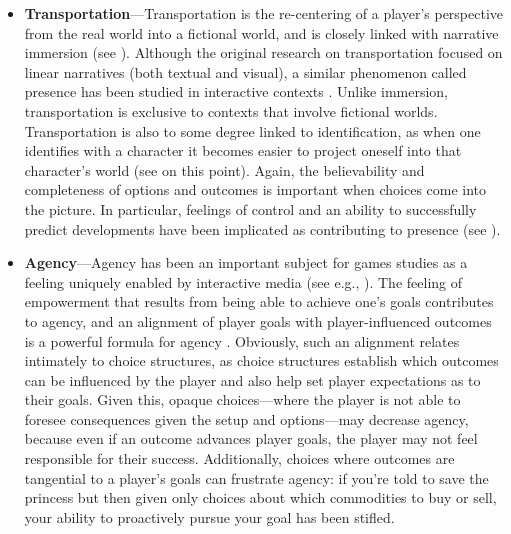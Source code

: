 \begin{itemize}
\item \textbf{Transportation}---Transportation is the re-centering of a player's perspective from the real world into a fictional world, and is closely linked with narrative immersion (see \citep{Green2000,Green2004}).
%
Although the original research on transportation focused on linear narratives (both textual and visual), a similar phenomenon called presence has been studied in interactive contexts \citep{Witmer1998}.
%
Unlike immersion, transportation is exclusive to contexts that involve fictional worlds.
%
Transportation is also to some degree linked to identification, as when one identifies with a character it becomes easier to project oneself into that character's world (see \citep{Busselle2009} on this point).
%
Again, the believability and completeness of options and outcomes is important when choices come into the picture.
%
In particular, feelings of control and an ability to successfully predict developments have been implicated as contributing to presence (see \citep{Witmer1998}).

\item \textbf{Agency}---Agency has been an important subject for games studies as a feeling uniquely enabled by interactive media (see e.g., \citep{Murray1997,Mateas2001,WardripFruin2009,Mason2013}).
%
The feeling of empowerment that results from being able to achieve one's goals contributes to agency, and an alignment of player goals with player-influenced outcomes is a powerful formula for agency \citep{Mateas2001}.
%
Obviously, such an alignment relates intimately to choice structures, as choice structures establish which outcomes can be influenced by the player and also help set player expectations as to their goals.
%
Given this, opaque choices---where the player is not able to foresee consequences given the setup and options---may decrease agency, because even if an outcome advances player goals, the player may not feel responsible for their success.
%
Additionally, choices where outcomes are tangential to a player's goals can frustrate agency: if you're told to save the princess but then given only choices about which commodities to buy or sell, your ability to proactively pursue your goal has been stifled.



\end{itemize}

